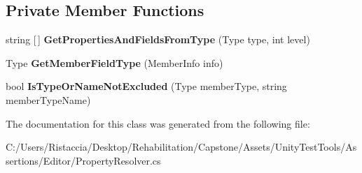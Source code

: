 \subsection*{Private Member Functions}
\begin{DoxyCompactItemize}
\item 
\mbox{\label{class_unity_test_1_1_property_resolver_af547fa307a9eacacd92d96a325214816}} 
string \mbox{[}$\,$\mbox{]} {\bfseries Get\+Properties\+And\+Fields\+From\+Type} (Type type, int level)
\item 
\mbox{\label{class_unity_test_1_1_property_resolver_a49251bddad0b6cc4c3c8061ffbc0858a}} 
Type {\bfseries Get\+Member\+Field\+Type} (Member\+Info info)
\item 
\mbox{\label{class_unity_test_1_1_property_resolver_ac9a6e56fb6316dcab7c1c3f3fb5f20e3}} 
bool {\bfseries Is\+Type\+Or\+Name\+Not\+Excluded} (Type member\+Type, string member\+Type\+Name)
\end{DoxyCompactItemize}


The documentation for this class was generated from the following file\+:\begin{DoxyCompactItemize}
\item 
C\+:/\+Users/\+Ristaccia/\+Desktop/\+Rehabilitation/\+Capstone/\+Assets/\+Unity\+Test\+Tools/\+Assertions/\+Editor/Property\+Resolver.\+cs\end{DoxyCompactItemize}
